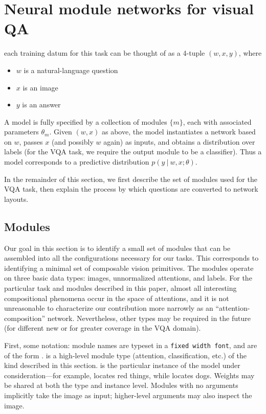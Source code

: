 
\section{Neural module networks for visual QA}

each training datum for this task can be thought of as a 4-tuple $(w, x, y)$, where
\begin{itemize}
  \setlength\itemsep{0em}
  \item $w$ is a natural-language question
  \item $x$ is an image
  \item $y$ is an answer
\end{itemize}
A model is fully specified by a collection of modules $\{ m \}$, each with
associated parameters $\theta_m$. Given $(w, x)$ as above, the model
instantiates a network based on $w$, passes $x$ (and possibly $w$ again) as
inputs, and obtains a distribution over labels (for the VQA task, we require the
output module to be a classifier). Thus a model corresponds to a predictive
distribution $p(y\ |\ w, x; \theta)$.

In the remainder of this section, we first describe the set of modules used for
the VQA task, then explain the process by which questions are converted to
network layouts.

\subsection{Modules}

Our goal in this section is to identify a small set of modules that can be
assembled into all the configurations necessary for our tasks. This corresponds
to identifying a minimal set of composable vision primitives. The modules
operate on three basic data types: images, unnormalized attentions, and labels.
For the particular task and modules described in this paper, almost all
interesting compositional phenomena occur in the space of attentions, and it is
not unreasonable to characterize our contribution more narrowly as an
``attention-composition'' network. Nevertheless, other types may be
required in the future (for different new or for greater coverage in the VQA
domain).

First, some notation: module names are typeset in a {\tt fixed width font}, and
are of the form .  is a
high-level module type (attention, classification, etc.) of the kind described
in this section.  is the particular instance of the model under
consideration---for example,  locates red things, while
 locates dogs. Weights may be shared at both the type and
instance level. Modules with no arguments implicitly take the image as input;
higher-level arguments may also inspect the image.

